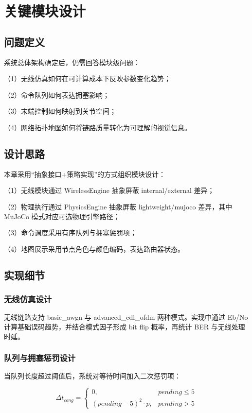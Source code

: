 
\section{关键模块设计}

\subsection{问题定义}
系统总体架构确定后，仍需回答模块级问题：

（1）无线仿真如何在可计算成本下反映参数变化趋势；

（2）命令队列如何表达拥塞影响；

（3）末端控制如何映射到关节空间；

（4）网络拓扑地图如何将链路质量转化为可理解的视觉信息。

\subsection{设计思路}
本章采用“抽象接口+策略实现”的方式组织模块设计：

（1）无线模块通过 WirelessEngine 抽象屏蔽 internal/external 差异；

（2）物理执行通过 PhysicsEngine 抽象屏蔽 lightweight/mujoco 差异，其中 MuJoCo 模式对应可选物理引擎路径\cite{mujoco_docs}；

（3）命令调度采用有序队列与拥塞惩罚项；

（4）地图展示采用节点角色与颜色编码，表达路由器状态。

\subsection{实现细节}
\subsubsection{无线仿真设计}
无线链路支持 basic\_awgn 与 advanced\_cdl\_ofdm 两种模式。实现中通过 Eb/No 计算基础误码趋势，并结合模式因子形成 bit flip 概率，再统计 BER 与无线处理时延。

\subsubsection{队列与拥塞惩罚设计}
当队列长度超过阈值后，系统对等待时间加入二次惩罚项：

\begin{equation}
\Delta t_{cong}=\begin{cases}
0, & pending\leq 5\\
(pending-5)^2 \cdot p, & pending>5
\end{cases}
\end{equation}

